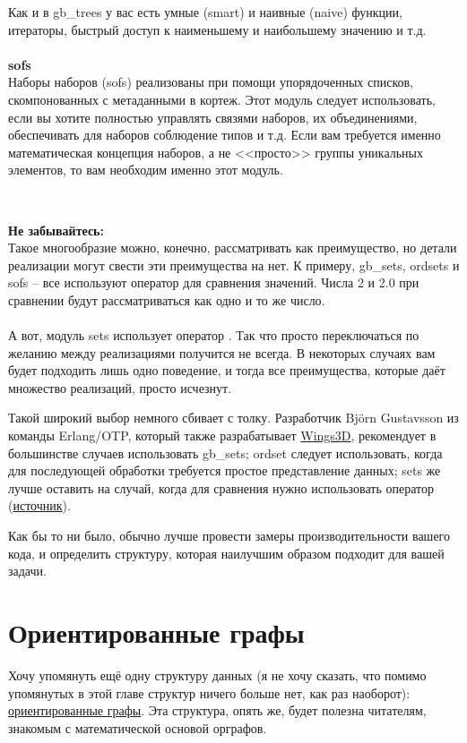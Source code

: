 \begin{minipage}{1.0\linewidth}
    Как и в gb\_trees у вас есть умные (smart) и наивные (naive) функции, итераторы, быстрый доступ к наименьшему и наибольшему значению и т.д.\\
    \\
    \textbf{sofs}\\
    Наборы наборов (sofs) реализованы при помощи упорядоченных списков, скомпонованных с метаданными в кортеж.
    Этот модуль следует использовать, если вы хотите полностью управлять связями наборов, их объединениями, обеспечивать для наборов соблюдение типов и т.д.
    Если вам требуется именно математическая концепция наборов, а не <<просто>> группы уникальных элементов, то вам необходим  именно этот модуль.
\end{minipage}
\\
\colorbox{lorange}
{
    \begin{minipage}{1.0\linewidth}
        \textbf{Не забывайтесь:}\\
        Такое многообразие можно, конечно, рассматривать как преимущество, но детали реализации могут свести эти преимущества на нет.
        К примеру, gb\_sets, ordsets и sofs \--- все используют оператор \ops{==} для сравнения значений.
        Числа 2 и 2.0 при сравнении будут рассматриваться как одно и то же число.\\
        \\
        А вот, модуль sets использует оператор \ops{=:=}.
        Так что просто переключаться по желанию между реализациями получится не всегда.
        В некоторых случаях вам будет подходить лишь одно поведение, и тогда все преимущества, которые даёт множество реализаций, просто исчезнут.
    \end{minipage}
}

Такой широкий выбор немного сбивает с толку.
Разработчик Bj\"{o}rn Gustavsson из команды Erlang/OTP, который также разрабатывает \href{http://www.wings3d.com/}{Wings3D}, рекомендует в большинстве случаев использовать gb\_sets; ordset следует использовать, когда для последующей обработки требуется простое представление данных; sets же лучше оставить на случай, когда для сравнения нужно использовать оператор \ops{=:=} (\href{http://erlang.org/pipermail/erlang-questions/2010-March/050332.html}{источник}).

Как бы то ни было, обычно лучше провести замеры производительности вашего кода, и определить структуру, которая наилучшим образом подходит для вашей задачи.
\section{Ориентированные графы}
\label{directed-graphs}
Хочу упомянуть ещё одну структуру данных (я не хочу сказать, что помимо упомянутых в этой главе структур ничего больше нет, как раз наоборот): \href{http://en.wikipedia.org/wiki/Directed\_graph}{ориентированные графы}.
Эта структура, опять же, будет полезна читателям, знакомым с математической основой орграфов.

